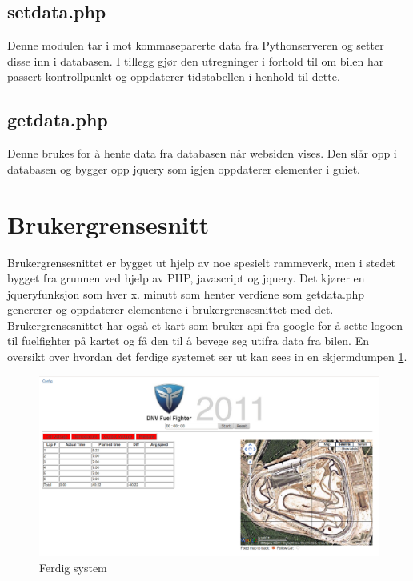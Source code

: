 \subsection{setdata.php}
Denne modulen tar i mot kommaseparerte data fra Pythonserveren og setter disse inn i databasen. I tillegg gjør den utregninger i forhold til om bilen har passert kontrollpunkt og oppdaterer tidstabellen i henhold til dette.
\subsection{getdata.php}
Denne brukes for å hente data fra databasen når websiden vises. Den slår opp i databasen og bygger opp jquery som igjen oppdaterer elementer i guiet.
\section{Brukergrensesnitt}
Brukergrensesnittet er bygget ut hjelp av noe spesielt rammeverk, men i stedet bygget fra grunnen ved hjelp av PHP, javascript og jquery. Det kjører en jqueryfunksjon som hver x. minutt som henter verdiene som getdata.php genererer og oppdaterer elementene i brukergrensesnittet med det. Brukergrensesnittet har også et kart som bruker api fra google for å sette logoen til fuelfighter på kartet og få den til å bevege seg utifra data fra bilen. En oversikt over hvordan det ferdige systemet ser ut kan sees in en skjermdumpen \ref{gui}.
\begin{figure}[H]
\caption{Ferdig system} 
\label{gui}
\includegraphics[width=\textwidth]{images/gui.png}
\end{figure}
